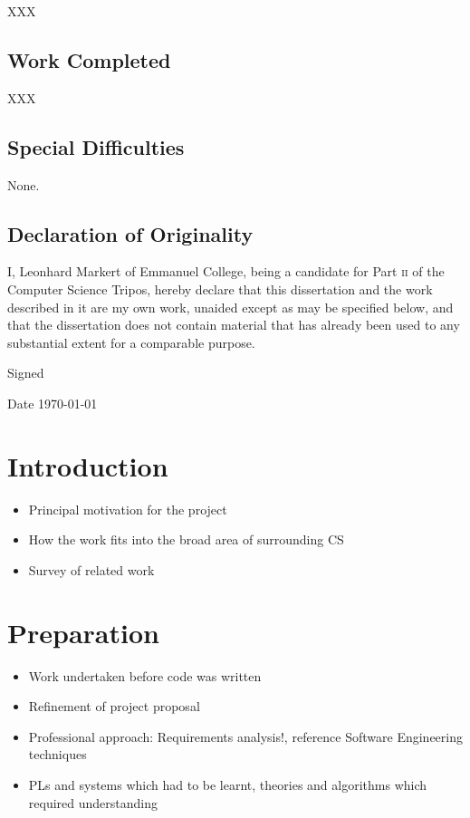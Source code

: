 \documentclass[11pt,chapterprefix=true,toc=bibliography]{scrreprt}
\begin{document}
XXX

\section*{Work Completed%
      \label{work-completed}%
}

XXX

\section*{Special Difficulties%
      \label{special-difficulties}%
}

None.

\section*{Declaration of Originality%
   \label{declaration-of-originality}%
}

I, Leonhard Markert of Emmanuel College, being a candidate for Part \textsc{ii} of the Computer Science Tripos, hereby declare that this dissertation and the work described in it are my own work, unaided except as may be specified below, and that the dissertation does not contain material that has already been used to any substantial extent for a comparable purpose.

\vspace{0.3in}
Signed

\vspace{0.2in}
Date \hspace{0.4in} \today

\tableofcontents

\chapter{Introduction%
  \label{introduction}%
}

\begin{itemize}
    \item Principal motivation for the project
    \item How the work fits into the broad area of surrounding CS
    \item Survey of related work
\end{itemize}

\chapter{Preparation%
  \label{preparation}%
}

\begin{itemize}
    \item Work undertaken before code was written
    \item Refinement of project proposal
    \item Professional approach: Requirements analysis!, reference Software Engineering techniques
    \item PLs and systems which had to be learnt, theories and algorithms which required understanding
\end{itemize}
\end{document}
